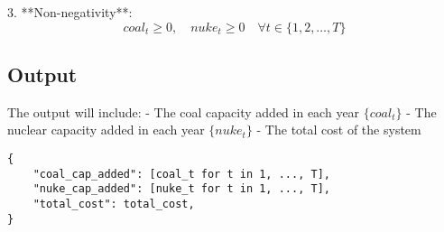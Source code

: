 \documentclass{article}
\begin{document}
3. **Non-negativity**:
   \[
   coal_t \geq 0, \quad nuke_t \geq 0 \quad \forall t \in \{1, 2, \ldots, T\}
   \]

\subsection*{Output}
The output will include:
- The coal capacity added in each year \( \{coal_t\} \)
- The nuclear capacity added in each year \( \{nuke_t\} \)
- The total cost of the system

\begin{verbatim}
{
    "coal_cap_added": [coal_t for t in 1, ..., T],
    "nuke_cap_added": [nuke_t for t in 1, ..., T],
    "total_cost": total_cost,
}
\end{verbatim}
\end{document}
